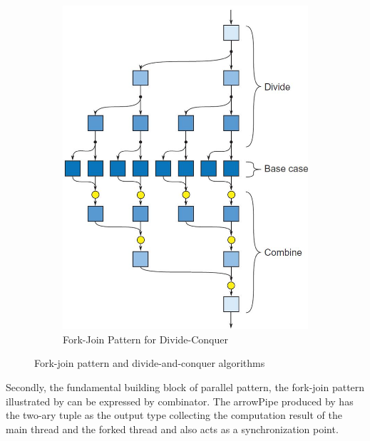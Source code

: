 \begin{figure}[ht]
\begin{subfigure}[b]{0.475\textwidth}
        \includegraphics[width=\textwidth]{arrow/dq.png}
        \caption{Fork-Join Pattern for Divide-Conquer \cite{mccoolStructuredParallelPrograming2012}}
        \label{arrowPipe:fig:dq}
    \end{subfigure}
    \caption{Fork-join pattern and divide-and-conquer algorithms}
\end{figure}
Secondly, the fundamental building block of parallel pattern, the fork-join pattern illustrated by  can be expressed by \hask{&&&} combinator. The arrowPipe produced by \hask{&&&} has the two-ary tuple as the output type collecting the computation result of the main thread and the forked thread and also acts as a synchronization point.

